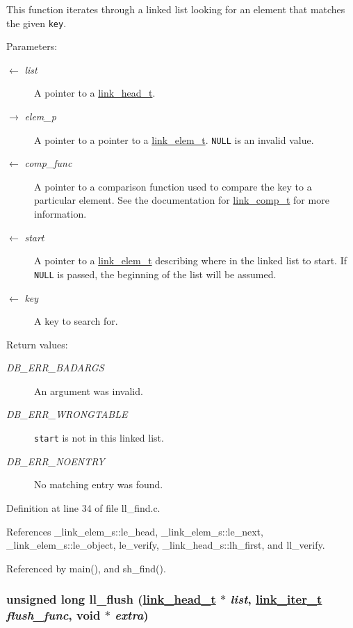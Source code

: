 This function iterates through a linked list looking for an element that matches the given {\tt key}.

\begin{Desc}
\item[Parameters:]
\begin{description}
\item[\mbox{$\leftarrow$} {\em list}]A pointer to a \hyperlink{group__dbprim__link_ga0}{link\_\-head\_\-t}. \item[\mbox{$\rightarrow$} {\em elem\_\-p}]A pointer to a pointer to a \hyperlink{group__dbprim__link_ga1}{link\_\-elem\_\-t}. {\tt NULL} is an invalid value. \item[\mbox{$\leftarrow$} {\em comp\_\-func}]A pointer to a comparison function used to compare the key to a particular element. See the documentation for \hyperlink{group__dbprim__link_ga3}{link\_\-comp\_\-t} for more information. \item[\mbox{$\leftarrow$} {\em start}]A pointer to a \hyperlink{group__dbprim__link_ga1}{link\_\-elem\_\-t} describing where in the linked list to start. If {\tt NULL} is passed, the beginning of the list will be assumed. \item[\mbox{$\leftarrow$} {\em key}]A key to search for.\end{description}
\end{Desc}
\begin{Desc}
\item[Return values:]
\begin{description}
\item[{\em DB\_\-ERR\_\-BADARGS}]An argument was invalid. \item[{\em DB\_\-ERR\_\-WRONGTABLE}]{\tt start} is not in this linked list. \item[{\em DB\_\-ERR\_\-NOENTRY}]No matching entry was found.\end{description}
\end{Desc}


Definition at line 34 of file ll\_\-find.c.

References \_\-link\_\-elem\_\-s::le\_\-head, \_\-link\_\-elem\_\-s::le\_\-next, \_\-link\_\-elem\_\-s::le\_\-object, le\_\-verify, \_\-link\_\-head\_\-s::lh\_\-first, and ll\_\-verify.

Referenced by main(), and sh\_\-find().\hypertarget{group__dbprim__link_ga11}{
\subsubsection[ll\_\-flush]{\setlength{\rightskip}{0pt plus 5cm}unsigned long ll\_\-flush (\hyperlink{struct__link__head__s}{link\_\-head\_\-t} $\ast$ {\em list}, \hyperlink{group__dbprim__link_ga2}{link\_\-iter\_\-t} {\em flush\_\-func}, void $\ast$ {\em extra})}}
\label{group__dbprim__link_ga11}


